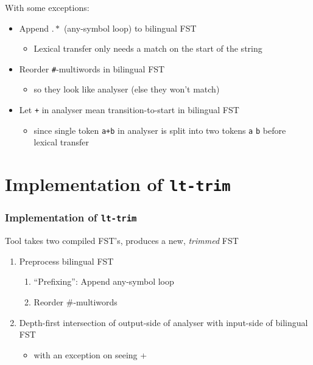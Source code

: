 \documentclass[notes=hide]{beamer}
\newcommand{\ana}[1]{\texttt{#1}}
\newcommand{\tool}[1]{\texttt{#1}}
\begin{document}
\begin{frame}
  With some exceptions:
  \begin{itemize}
  \item Append $.*$ (any-symbol loop) to bilingual FST
    \begin{itemize}
    \item Lexical transfer only needs a match on the start of the
      string
    \end{itemize}

  \item Reorder \ana{\#}-multiwords in bilingual FST
    \begin{itemize}
    \item so they look like analyser (else they won't match)
    \end{itemize}

  \item Let \ana{+} in analyser mean transition-to-start in bilingual
    FST
    \begin{itemize}
    \item since single token \ana{a+b} in analyser is split into two
      tokens \ana{a} \ana{b} before lexical transfer
    \end{itemize}

  \end{itemize}
\end{frame}

\section{Implementation of \tool{lt-trim}}
\begin{frame}
  \frametitle{Implementation of \tool{lt-trim}}
  Tool takes two compiled FST's, produces a new, \emph{trimmed} FST
  \begin{enumerate}
  \item Preprocess bilingual FST
    \begin{enumerate}
    \item ``Prefixing'': Append any-symbol loop
    \item Reorder \#-multiwords
    \end{enumerate}
  \item Depth-first intersection of output-side of analyser with
    input-side of bilingual FST
    \begin{itemize}
    \item with an exception on seeing +
    \end{itemize}
  \end{enumerate}
\end{frame}
\end{document}
